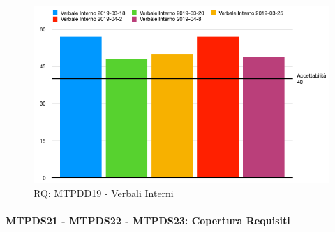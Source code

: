 \begin{figure}[H]
	\begin{center}
		\includegraphics[scale=0.5]{./images/grafici_RQ/gulpeaseVerbali.png} 
	\end{center}
	\caption{RQ: MTPDD19 - Verbali Interni}
\end{figure}

\pagebreak

\paragraph{MTPDS21 - MTPDS22 - MTPDS23: Copertura Requisiti}\-\\\label{copReq}

